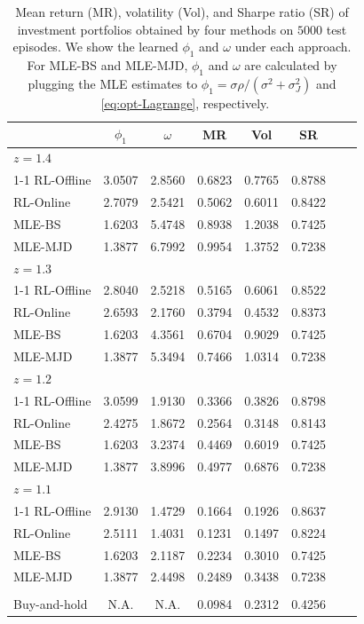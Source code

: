 \documentclass[11pt]{article}
\newcommand{\1}{\mathbbm{1}}
\begin{document}
\begin{table}[htbp!]
	\centering
	\begin{tabular}{lccccccc}
		\toprule
		& $\phi_1$  & $\omega$& MR & Vol & SR \\
		\midrule
		$z=1.4$ & & & &  \\
		\cmidrule(lr){1-1}
		RL-Offline &  3.0507  & 2.8560  & 0.6823  & 0.7765  & 0.8788  \\
		RL-Online   &2.7079  & 2.5421  & 0.5062  & 0.6011  & 0.8422 \\
		MLE-BS  & 1.6203  & 5.4748  & 0.8938  & 1.2038  & 0.7425 \\
		MLE-MJD & 1.3877  & 6.7992  & 0.9954  & 1.3752  & 0.7238\\
		\midrule
		$z=1.3$ & & & &  \\
		\cmidrule(lr){1-1}
		RL-Offline & 2.8040  & 2.5218  & 0.5165  & 0.6061  & 0.8522\\
		RL-Online  &2.6593  & 2.1760  & 0.3794  & 0.4532  & 0.8373  \\
		MLE-BS & 1.6203  & 4.3561  & 0.6704  & 0.9029  & 0.7425\\
		MLE-MJD &1.3877  & 5.3494  & 0.7466  & 1.0314  & 0.7238 \\
		\midrule
		$z=1.2$ & & & &  \\
		\cmidrule(lr){1-1}
		RL-Offline& 3.0599  & 1.9130  & 0.3366  & 0.3826  & 0.8798   \\
		RL-Online  & 2.4275  & 1.8672  & 0.2564  & 0.3148  & 0.8143\\
		MLE-BS & 1.6203  & 3.2374  & 0.4469  & 0.6019  & 0.7425\\
		MLE-MJD  & 1.3877  & 3.8996  & 0.4977  & 0.6876  & 0.7238 \\
		\midrule
		$z=1.1$ & & & &  \\
		\cmidrule(lr){1-1}
		RL-Offline& 2.9130  & 1.4729  & 0.1664  & 0.1926  & 0.8637\\
		RL-Online & 2.5111  & 1.4031  & 0.1231  & 0.1497  & 0.8224  \\
		MLE-BS &1.6203  & 2.1187  & 0.2234  & 0.3010  & 0.7425\\
		MLE-MJD & 1.3877  & 2.4498  & 0.2489  & 0.3438  & 0.7238 \\
		& & & & & \\
		Buy-and-hold & N.A. & N.A. & 0.0984 & 0.2312 & 0.4256 \\
		\bottomrule
	\end{tabular}
	\caption{Mean return (MR), volatility (Vol), and Sharpe ratio (SR) of investment portfolios obtained by four methods on $5000$ test episodes. We show the learned $\phi_1$ and $\omega$ under each approach. For MLE-BS and MLE-MJD, $\phi_1$ and $\omega$ are calculated by plugging the MLE estimates to $\phi_1=\sigma\rho/(\sigma^2+\sigma_J^2)$ and ~\protect\eqref{eq:opt-Lagrange}, respectively. } \label{tab:testSPY}
\end{table}
\end{document}
